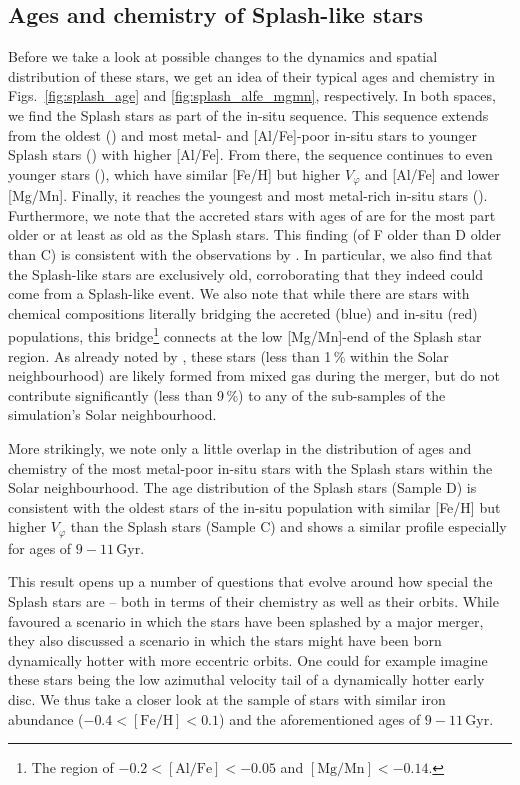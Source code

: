 \documentclass[fleqn,usenatbib]{mnras}
\begin{document}
\subsection{Ages and chemistry of Splash-like stars}

Before we take a look at possible changes to the dynamics and spatial distribution of these stars, we get an idea of their typical ages and chemistry in Figs.~\ref{fig:splash_age} and \ref{fig:splash_alfe_mgmn}, respectively. In both spaces, we find the Splash stars as part of the in-situ sequence. This sequence extends from the oldest  () and most metal- and [Al/Fe]-poor in-situ stars to younger Splash stars () with higher [Al/Fe]. From there, the sequence continues to even younger stars (), which have similar [Fe/H] but higher $V_\varphi$ and [Al/Fe] and lower [Mg/Mn]. Finally, it reaches the youngest and most metal-rich in-situ stars (). Furthermore, we note that the accreted stars with ages of  are for the most part older or at least as old as the Splash stars. This finding (of F older than D older than C) is consistent with the observations by \citet{Belokurov2020}. In particular, we also find that the Splash-like stars are exclusively old, corroborating that they indeed could come from a Splash-like event. We also note that while there are stars with chemical compositions literally bridging the accreted (blue) and in-situ (red) populations, this bridge\footnote{The region of $-0.2 < \mathrm{[Al/Fe]} < -0.05$ and $\mathrm{[Mg/Mn]} < -0.14$.} connects at the low [Mg/Mn]-end of the Splash star region. As already noted by \citet{Buder2024}, these stars  (less than 1\,\% within the Solar neighbourhood) are likely formed from mixed gas during the merger, but do not contribute significantly (less than 9\,\%) to any of the sub-samples of the simulation's Solar neighbourhood.

More strikingly, we note only a little overlap in the distribution of ages and chemistry of the most metal-poor in-situ stars with the Splash stars within the Solar neighbourhood. The age distribution of the Splash stars (Sample D) is consistent with the oldest stars of the in-situ population with similar [Fe/H] but higher $V_\varphi$ than the Splash stars (Sample C) and shows a similar profile especially for ages of $9-11\,\mathrm{Gyr}$.

This result opens up a number of questions that evolve around how special the Splash stars are -- both in terms of their chemistry as well as their orbits. While \citet{Belokurov2020} favoured a scenario in which the stars have been splashed by a major merger, they also discussed a scenario in which the stars might have been born dynamically hotter with more eccentric orbits. One could for example imagine these stars being the low azimuthal velocity tail of a dynamically hotter early disc. We thus take a closer look at the sample of stars with similar iron abundance ($-0.4 < \mathrm{[Fe/H]} < 0.1$) and the aforementioned ages of $9-11\,\mathrm{Gyr}$.
\end{document}
